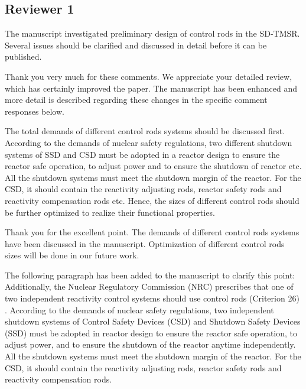 \documentclass[answers,11pt]{exam}
\begin{document}
\begin{questions}
        \section*{Reviewer 1}

        \question The manuscript investigated preliminary design of control rods in the SD-TMSR. Several issues should be clarified and discussed in detail before it can be published.

        \begin{solution}
                Thank you very much for these comments. We appreciate your detailed review, which has certainly improved the paper. The manuscript has been enhanced and more detail is described regarding these changes in the specific comment responses below.
        \end{solution}


        \question  The total demands of different control rods systems should be discussed first. According to the demands of nuclear safety regulations, two different shutdown systems of SSD and CSD must be adopted in a reactor design to ensure the reactor safe operation, to adjust power and to ensure the shutdown of reactor etc. All the shutdown systems must meet the shutdown margin of the reactor. For the CSD, it should contain the reactivity adjusting rods, reactor safety rods and reactivity compensation rods etc. Hence, the sizes of different control rods should be further optimized to realize their functional properties.
        \begin{solution}
        		 
        		Thank you for the excellent point. The demands of different control rods systems have been discussed in the manuscript. Optimization of different control rods sizes will be done in our future work.
        		        		
        		The following paragraph has been added to the manuscript to clarify this point:\\
        		
Additionally, the Nuclear Regulatory Commission (NRC) prescribes that one of two independent reactivity control systems should use control rods (Criterion 26) \cite{nuclear1987standard}. According to the demands of nuclear safety regulations, two independent shutdown systems of Control Safety Devices (CSD) and Shutdown Safety Devices (SSD) must be adopted in reactor design to ensure the reactor safe operation, to adjust power, and to ensure the shutdown of the reactor anytime independently. All the shutdown systems must meet the shutdown margin of the reactor. For the CSD, it should contain the reactivity adjusting rods, reactor safety rods and reactivity compensation rods.
        		    

\end{solution}
\end{questions}
\end{document}
